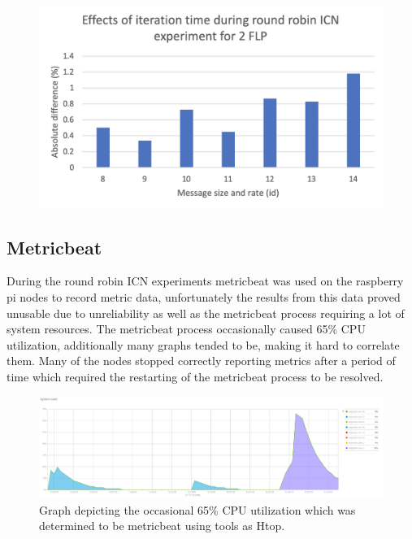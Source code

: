 \documentclass[]{article}
\begin{document}
\begin{center}
	\begin{figure}[H]
		\includegraphics[width=\textwidth]{"images/Effects of iteration time during round robin ICN experiment for 2 FLP"}
	\end{figure}
\end{center}

\subsection{Metricbeat}
During the round robin ICN experiments metricbeat was used on the raspberry pi nodes to record metric data, unfortunately the results from this data proved unusable due to unreliability as well as the metricbeat process requiring a lot of system resources. The metricbeat process occasionally caused 65\% CPU utilization, additionally many graphs tended to be, making it hard to correlate them. Many of the nodes stopped correctly reporting metrics after a period of time which required the restarting of the metricbeat process to be resolved.

\begin{center}
	\begin{figure}[H]
		\includegraphics[width=\textwidth]{images/metric-load}
		\caption{Graph depicting the occasional 65\% CPU utilization which was determined to be metricbeat using tools as Htop.}
		\label{fig:ssh}
	\end{figure}
\end{center}
\end{document}
